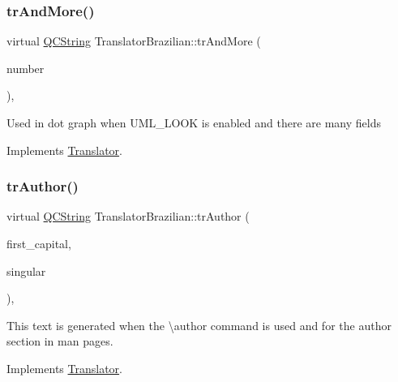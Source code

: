 \mbox{\label{class_translator_brazilian_a36d4243c3840fde560ab5ea4b7231568}} 
\subsubsection{\texorpdfstring{trAndMore()}{trAndMore()}}
{\footnotesize\ttfamily virtual \mbox{\hyperlink{class_q_c_string}{Q\+C\+String}} Translator\+Brazilian\+::tr\+And\+More (\begin{DoxyParamCaption}\item[{const \mbox{\hyperlink{class_q_c_string}{Q\+C\+String}} \&}]{number }\end{DoxyParamCaption})\hspace{0.3cm}{\ttfamily [inline]}, {\ttfamily [virtual]}}

Used in dot graph when U\+M\+L\+\_\+\+L\+O\+OK is enabled and there are many fields 

Implements \mbox{\hyperlink{class_translator}{Translator}}.

\mbox{\label{class_translator_brazilian_a7de830dbe6ef879a6575bdcdccfb36e7}} 
\subsubsection{\texorpdfstring{trAuthor()}{trAuthor()}}
{\footnotesize\ttfamily virtual \mbox{\hyperlink{class_q_c_string}{Q\+C\+String}} Translator\+Brazilian\+::tr\+Author (\begin{DoxyParamCaption}\item[{bool}]{first\+\_\+capital,  }\item[{bool}]{singular }\end{DoxyParamCaption})\hspace{0.3cm}{\ttfamily [inline]}, {\ttfamily [virtual]}}

This text is generated when the \textbackslash{}author command is used and for the author section in man pages. 

Implements \mbox{\hyperlink{class_translator}{Translator}}.

\mbox{\label{class_translator_brazilian_a957769a9879eb524bdc27912c84b3453}} 
